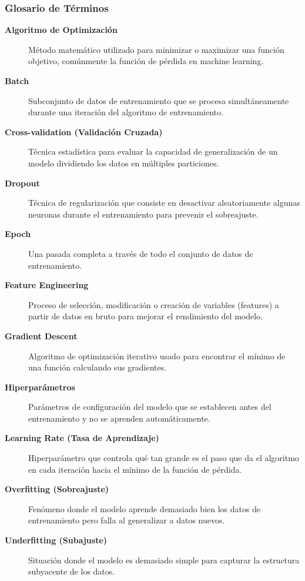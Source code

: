 \documentclass[11pt]{article} %
\begin{document}
\subsubsection{Glosario de Términos}
\begin{description}
    \item[\textbf{Algoritmo de Optimización}] Método matemático utilizado para minimizar o maximizar una función objetivo, comúnmente la función de pérdida en machine learning.

    \item[\textbf{Batch}] Subconjunto de datos de entrenamiento que se procesa simultáneamente durante una iteración del algoritmo de entrenamiento.
    
    \item[\textbf{Cross-validation (Validación Cruzada)}] Técnica estadística para evaluar la capacidad de generalización de un modelo dividiendo los datos en múltiples particiones.
    
    \item[\textbf{Dropout}] Técnica de regularización que consiste en desactivar aleatoriamente algunas neuronas durante el entrenamiento para prevenir el sobreajuste.
    
    \item[\textbf{Epoch}] Una pasada completa a través de todo el conjunto de datos de entrenamiento.
    
    \item[\textbf{Feature Engineering}] Proceso de selección, modificación o creación de variables (features) a partir de datos en bruto para mejorar el rendimiento del modelo.
    
    \item[\textbf{Gradient Descent}] Algoritmo de optimización iterativo usado para encontrar el mínimo de una función calculando sus gradientes.
    
    \item[\textbf{Hiperparámetros}] Parámetros de configuración del modelo que se establecen antes del entrenamiento y no se aprenden automáticamente.
    
    \item[\textbf{Learning Rate (Tasa de Aprendizaje)}] Hiperparámetro que controla qué tan grande es el paso que da el algoritmo en cada iteración hacia el mínimo de la función de pérdida.
    
    \item[\textbf{Overfitting (Sobreajuste)}] Fenómeno donde el modelo aprende demasiado bien los datos de entrenamiento pero falla al generalizar a datos nuevos.
    
    \item[\textbf{Underfitting (Subajuste)}] Situación donde el modelo es demasiado simple para capturar la estructura subyacente de los datos.
\end{description}
\end{document}
